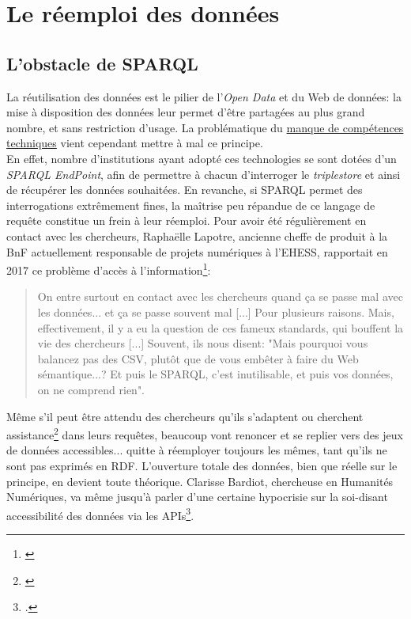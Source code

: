 \documentclass[a4paper,12pt,twoside]{book}
\begin{document}
\section{Le réemploi des données}
\subsection{L'obstacle de SPARQL}\label{obstacle-SPARQL}

La réutilisation des données est le pilier de l'\textit{Open Data} et du Web de données: la mise à disposition des données leur permet d'être partagées au plus grand nombre, et sans restriction d'usage. La problématique du \hyperref[3-competence]{manque de compétences techniques} vient cependant mettre à mal ce principe.\\

En effet, nombre d'institutions ayant adopté ces technologies se sont dotées d'un \textit{SPARQL EndPoint}, afin de permettre à chacun d'interroger le \textit{triplestore} et ainsi de récupérer les données souhaitées. En revanche, si SPARQL permet des interrogations extrêmement fines, la maîtrise peu répandue de ce langage de requête constitue un frein à leur réemploi. Pour avoir été régulièrement en contact avec les chercheurs, Raphaëlle Lapotre, ancienne cheffe de produit à la BnF actuellement responsable de projets numériques à l'EHESS, rapportait en 2017 ce problème d'accès à l'information\footnote{\cite[1h 35min 40sec]{banat-bergerQuelRenouvellementFormes2017}}:
\begin{quotation}
    \og On entre surtout en contact avec les chercheurs quand ça se passe mal avec les données... et ça se passe souvent mal [...] Pour plusieurs raisons. Mais, effectivement, il y a eu la question de ces fameux standards, qui bouffent la vie des chercheurs [...] Souvent, ils nous disent: "Mais pourquoi vous balancez pas des CSV, plutôt que de vous embêter à faire du Web sémantique...? Et puis le SPARQL, c'est inutilisable, et puis vos données, on ne comprend rien". \fg
\end{quotation}

Même s'il peut être attendu des chercheurs qu'ils \og s'adaptent \fg{} ou cherchent assistance\footnote{\cite[1h 41min]{banat-bergerQuelRenouvellementFormes2017}} dans leurs requêtes, beaucoup vont renoncer et se replier vers des jeux de données accessibles... quitte à réemployer toujours les mêmes, tant qu'ils ne sont pas exprimés en RDF. L'ouverture totale des données, bien que réelle sur le principe, en devient toute théorique. Clarisse Bardiot, chercheuse en Humanités Numériques, va même jusqu'à parler d'une \og certaine hypocrisie sur la soi-disant accessibilité des données via les APIs\fg\footnote{\cite{bardiotHappyAPIsDebridons2018}.}.\\
\end{document}
